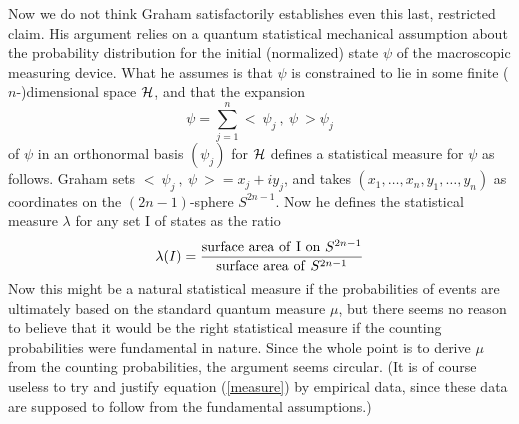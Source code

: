 \documentclass[aps,pra,12pt]{revtex4}
\begin{document}
Now we do not think Graham satisfactorily establishes even this 
last, restricted claim. His argument relies on a quantum statistical 
mechanical assumption about the probability distribution for the initial
(normalized) state $\psi$ of the macroscopic measuring device.
What he assumes is that $\psi$ is constrained to lie in some finite
($n$-)dimensional space ${\cal H}$, and that the expansion
\begin{equation}
\psi = \sum_{j=1}^{n} <~\psi_j~,~\psi~> \psi_j
\end{equation}
of $\psi$ in an orthonormal basis $( \psi_j )$ for ${\cal H}$ defines 
a statistical measure for $\psi$ as follows. 
Graham sets 
$<~\psi_j~,~\psi~> = x_j + i y_j$, and takes $(x_1 , \ldots , x_n , y_1 ,
\ldots , y_n )$ as coordinates on the $(2n - 1)$-sphere $S^{2n-1}$. 
Now he defines the statistical measure $\lambda$ 
for any set I of states as the ratio
\begin{equation}\label{measure}
\lambda (I) = 
\frac{{\rm surface~ area~ of~ I~ on} ~S^{2n-1}}{{\rm surface~ area~ of}~ S^{2n-1}}
\end{equation} 
Now this might be a natural statistical measure if the probabilities of
events are ultimately based on the standard 
quantum measure $\mu$, but there seems no reason to believe that it 
would be the right statistical measure if the counting 
probabilities were fundamental in nature. 
Since the whole point is to derive $\mu$ from the counting probabilities,
the argument seems circular. 
(It is of course useless to try and justify equation (\ref{measure}) by
empirical data, since these data are supposed to follow from the 
fundamental assumptions.)
\end{document}
